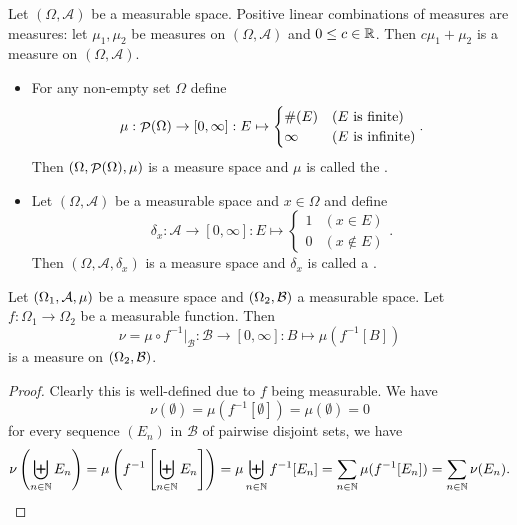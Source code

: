 \begin{lemma} \label{measuresPositiveLinear}
Let $(\Omega,\mathcal{A})$ be a measurable space. Positive linear combinations of measures are measures: let $\mu_1,\mu_2$ be measures on $(\Omega,\mathcal{A})$ and $0 \leq c \in \mathbb{R}$. Then $c\mu_1 + \mu_2$ is a measure on $(\Omega,\mathcal{A})$.
\end{lemma}

\begin{example}
\begin{itemize}
\item For any non-empty set $\Omega$ define
\[ \mu: \mathop{\mathcal{P}}(\Omega)\to [0,\infty]: E\mapsto \begin{cases}
\#(E) & \text{($E$ is finite)} \\
\infty & \text{($E$ is infinite)}
\end{cases}. \]
Then $(\Omega, \mathop{\mathcal{P}}(\Omega),\mu)$ is a measure space and $\mu$ is called the .
\item Let $(\Omega,\mathcal{A})$ be a measurable space and $x\in\Omega$ and define
\[ \delta_x: \mathcal{A}\to [0,\infty]: E\mapsto \begin{cases}
1 & (x\in E) \\ 0 & (x\notin E)
\end{cases}. \]
Then $(\Omega,\mathcal{A},\delta_x)$ is a measure space and $\delta_x$ is called a .
\end{itemize}
\end{example}

\begin{proposition} \label{pushforwardMeasure}
Let $\left( \Omega_1, \mathcal{A}, \mu \right)$ be a measure space and $\left( \Omega_2, \mathcal{B} \right)$ a measurable space. Let $f: \Omega_1 \to \Omega_2$ be a measurable function. Then
\[ \nu = \mu\circ f^{-1}|_{\mathcal{B}}: \mathcal{B}\to [0,\infty]: B \mapsto \mu(f^{-1}[B]) \]
is a measure on $\left( \Omega_2, \mathcal{B} \right)$.
\end{proposition}
\begin{proof}
Clearly this is well-defined due to $f$ being measurable. We have
\[ \nu(\emptyset) = \mu(f^{-1}[\emptyset])  = \mu(\emptyset) = 0 \]
for every sequence $(E_n)$ in $\mathcal{B}$ of pairwise disjoint sets, we have
\[ \nu\left(\biguplus_{n\in\mathbb{N}}E_n\right) = \mu\left(f^{-1}\left[\biguplus_{n\in\mathbb{N}}E_n\right]\right) = \mu\biguplus_{n\in\mathbb{N}} f^{-1}[E_n]  = \sum_{n\in\mathbb{N}}\mu(f^{-1}[E_n]) = \sum_{n\in\mathbb{N}}\nu(E_n). \]
\end{proof}

